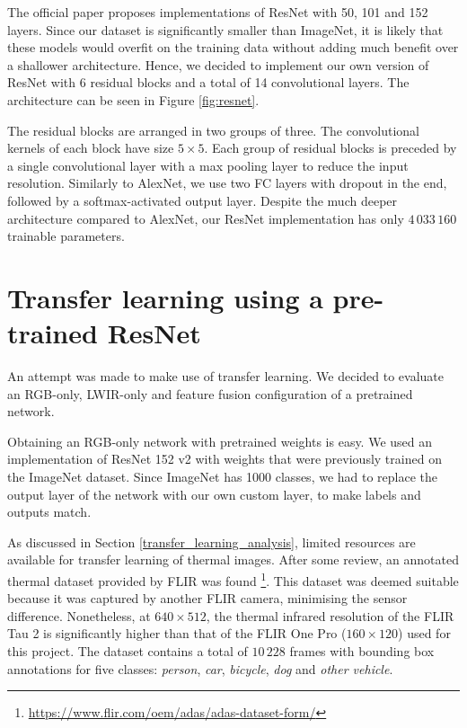 \documentclass{l4proj}
\begin{document}
The official paper proposes implementations of ResNet with 50, 101 and 152 layers. Since our dataset is significantly smaller than ImageNet, it is likely that these models would overfit on the training data without adding much benefit over a shallower architecture. Hence, we decided to implement our own version of ResNet with 6 residual blocks and a total of 14 convolutional layers. The architecture can be seen in Figure \ref{fig:resnet}.

The residual blocks are arranged in two groups of three. The convolutional kernels of each block have size $5 \times 5$. Each group of residual blocks is preceded by a single convolutional layer with a max pooling layer to reduce the input resolution. Similarly to AlexNet, we use two FC layers with dropout in the end, followed by a softmax-activated output layer. Despite the much deeper architecture compared to AlexNet, our ResNet implementation has only $4\,033\,160$ trainable parameters.



\section{Transfer learning using a pre-trained ResNet}

An attempt was made to make use of transfer learning. We decided to evaluate an RGB-only, LWIR-only and feature fusion configuration of a pretrained network. 

Obtaining an RGB-only network with pretrained weights is easy. We used an implementation of ResNet 152 v2 \citep{he_identity_2016} with weights that were previously trained on the ImageNet dataset. Since ImageNet has 1000 classes, we had to replace the output layer of the network with our own custom layer, to make labels and outputs match.

As discussed in Section \ref{transfer_learning_analysis}, limited resources are available for transfer learning of thermal images. After some review, an annotated thermal dataset provided by FLIR was found \footnote{\url{https://www.flir.com/oem/adas/adas-dataset-form/}}. This dataset was deemed suitable because it was captured by another FLIR camera, minimising the sensor difference. Nonetheless, at $640 \times 512$, the thermal infrared resolution of the FLIR Tau 2 is significantly higher than that of the FLIR One Pro ($160 \times 120$) used for this project. The dataset contains a total of $10\,228$ frames with bounding box annotations for five classes: \textit{person}, \textit{car}, \textit{bicycle}, \textit{dog} and \textit{other vehicle}.
\end{document}
